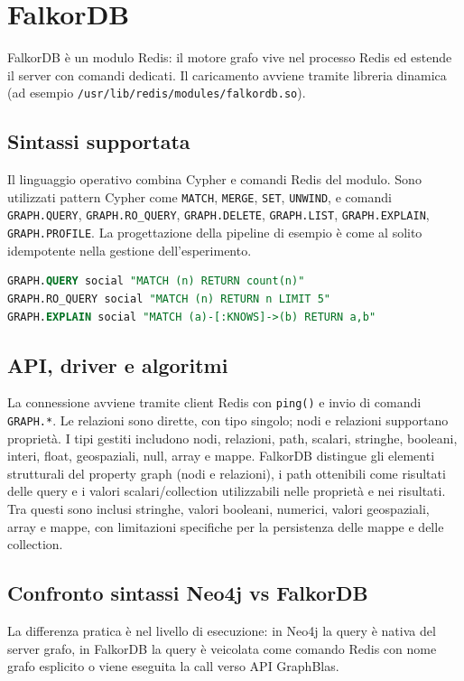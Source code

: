 \documentclass{article}
\begin{document}

\section{FalkorDB}
FalkorDB è un modulo Redis: il motore grafo vive nel processo Redis ed estende il server con comandi dedicati. %
Il caricamento avviene tramite libreria dinamica (ad esempio \texttt{/usr/lib/redis/modules/falkordb.so}).

\subsection{Sintassi supportata}
Il linguaggio operativo combina Cypher e comandi Redis del modulo. %
Sono utilizzati pattern Cypher come \texttt{MATCH}, \texttt{MERGE}, \texttt{SET}, %
\texttt{UNWIND}, e comandi \texttt{GRAPH.QUERY}, \texttt{GRAPH.RO\_QUERY}, \texttt{GRAPH.DELETE}, %
\texttt{GRAPH.LIST}, \texttt{GRAPH.EXPLAIN}, \texttt{GRAPH.PROFILE}.
La progettazione della pipeline di esempio è come al solito idempotente nella gestione dell'esperimento. %

\begin{lstlisting}[language=SQL]
GRAPH.QUERY social "MATCH (n) RETURN count(n)"
GRAPH.RO_QUERY social "MATCH (n) RETURN n LIMIT 5"
GRAPH.EXPLAIN social "MATCH (a)-[:KNOWS]->(b) RETURN a,b"
\end{lstlisting}

\subsection{API, driver e algoritmi}
La connessione avviene tramite client Redis con \texttt{ping()} e invio di comandi \texttt{GRAPH.*}. %
Le relazioni sono dirette, con tipo singolo; nodi e relazioni supportano proprietà. %
I tipi gestiti includono nodi, relazioni, path, scalari, stringhe, booleani, interi, %
float, geospaziali, null, array e mappe.
FalkorDB distingue gli elementi strutturali del property graph (nodi e relazioni), %
i path ottenibili come risultati delle query e i valori scalari/collection utilizzabili %
nelle proprietà e nei risultati. Tra questi sono inclusi stringhe, valori booleani, %
numerici, valori geospaziali, array e mappe, con limitazioni specifiche per la persistenza %
delle mappe e delle collection.


\subsection{Confronto sintassi Neo4j vs FalkorDB}
La differenza pratica è nel livello di esecuzione: in Neo4j la query è nativa del server grafo, %
in FalkorDB la query è veicolata come comando Redis con nome grafo esplicito o viene eseguita la %
call verso API GraphBlas.
\end{document}

